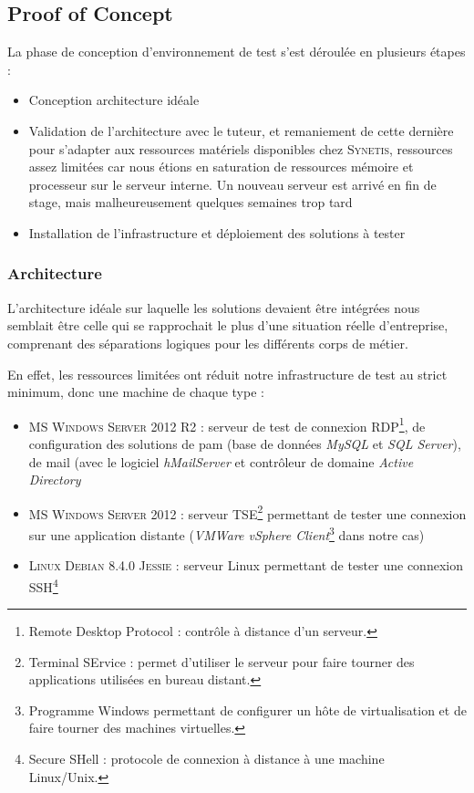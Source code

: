 \subsection{Proof of Concept}
\label{subec:poc}

La phase de conception d'environnement de test s'est déroulée en plusieurs étapes :
\begin{itemize}
	\item Conception architecture idéale
	\item Validation de l'architecture avec le tuteur, et remaniement de cette dernière pour s'adapter aux ressources matériels disponibles chez \textsc{Synetis}, ressources assez limitées car nous étions en saturation de ressources mémoire et processeur sur le serveur interne. Un nouveau serveur est arrivé en fin de stage, mais malheureusement quelques semaines trop tard
	\item Installation de l'infrastructure et déploiement des solutions à tester
\end{itemize}

\subsubsection{Architecture}
\label{par:archi}

L'architecture idéale sur laquelle les solutions devaient être intégrées nous semblait être celle qui se rapprochait le plus d'une situation réelle d'entreprise, comprenant des séparations logiques pour les différents corps de métier.

En effet, les ressources limitées ont réduit notre infrastructure de test au strict minimum, donc une machine de chaque type :
\begin{itemize}
	\item \textsc{MS Windows Server 2012 R2} : serveur de test de connexion RDP\footnote{Remote Desktop Protocol : contrôle à distance d'un serveur.}, de configuration des solutions de \gls{pam} (base de données \emph{MySQL} et \emph{SQL Server}), de mail (avec le logiciel \emph{hMailServer} \cite{hma} et contrôleur de domaine \emph{Active Directory}
	\item \textsc{MS Windows Server 2012} : serveur TSE\footnote{Terminal SErvice : permet d'utiliser le serveur pour faire tourner des applications utilisées en bureau distant.} permettant de tester une connexion sur une application distante (\emph{VMWare vSphere Client}\footnote{Programme Windows permettant de configurer un hôte de virtualisation et de faire tourner des machines virtuelles.} dans notre cas)
	\item \textsc{Linux Debian 8.4.0 Jessie} : serveur Linux permettant de tester une connexion SSH\footnote{Secure SHell : protocole de connexion à distance à une machine Linux/Unix.}
\end{itemize}

